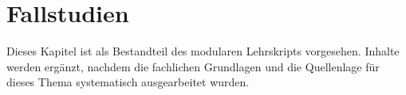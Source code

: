 \chapter{Fallstudien}
\label{chap:20-fallstudien}

Dieses Kapitel ist als Bestandteil des modularen Lehrskripts vorgesehen.
Inhalte werden ergänzt, nachdem die fachlichen Grundlagen und die
Quellenlage für dieses Thema systematisch ausgearbeitet wurden.
